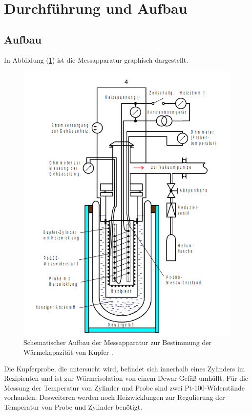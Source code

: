 \newpage
\section{Durchführung und Aufbau}
\label{Aufbau}
\subsection{Aufbau}
In Abbildung (\ref{fig:aufbau1}) ist die Messapparatur graphisch dargestellt.
\begin{figure}
	\centering
	\includegraphics[scale=0.5]{fig/aufbau.png}
	\caption{Schematischer Aufbau der Messapparatur zur Bestimmung der Wärmekapazität von Kupfer \cite[4]{Anleitung}.}
	\label{fig:aufbau1}
\end{figure}
\FloatBarrier
\noindent Die Kupferprobe, die untersucht wird, befindet sich innerhalb eines Zylinders im Rezipienten und ist zur Wärmeisolation von einem Dewar-Gefäß umhüllt.
Für die Messung der Temperatur von Zylinder und Probe sind zwei Pt-100-Widerstände vorhanden. Desweiteren werden noch Heizwicklungen zur Regulierung der Temperatur von Probe und Zylinder benötigt.
